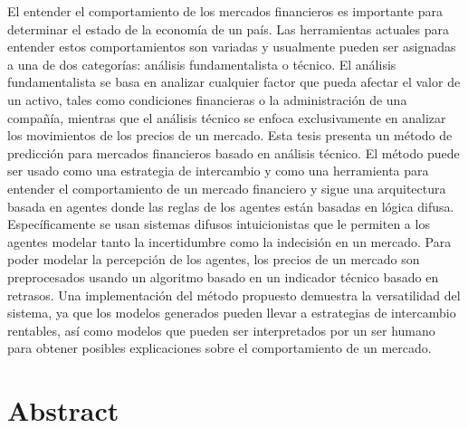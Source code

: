 % 
% 
%

El entender el comportamiento de los mercados financieros es importante para
determinar el estado de la economía de un país. Las herramientas actuales para
entender estos comportamientos son variadas y usualmente pueden ser asignadas a
una de dos categorías: análisis fundamentalista o técnico. El análisis
fundamentalista se basa en analizar cualquier factor que pueda afectar el valor
de un activo, tales como condiciones financieras o la administración de una
compañía, mientras que el análisis técnico se enfoca exclusivamente en analizar
los movimientos de los precios de un mercado. Esta tesis presenta un método de
predicción para mercados financieros basado en análisis técnico. El método puede
ser usado como una estrategia de intercambio y como una herramienta para
entender el comportamiento de un mercado financiero y sigue una arquitectura
basada en agentes donde las reglas de los agentes están basadas en lógica
difusa. Específicamente se usan sistemas difusos intuicionistas que le permiten
a los agentes modelar tanto la incertidumbre como la indecisión en un mercado.
Para poder modelar la percepción de los agentes, los precios de un mercado son
preprocesados usando un algoritmo basado en un indicador técnico basado en
retrasos. Una implementación del método propuesto demuestra la versatilidad del
sistema, ya que los modelos generados pueden llevar a estrategias de intercambio
rentables, así como modelos que pueden ser interpretados por un ser humano para
obtener posibles explicaciones sobre el comportamiento de un mercado.

\clearpage
\section*{Abstract}

